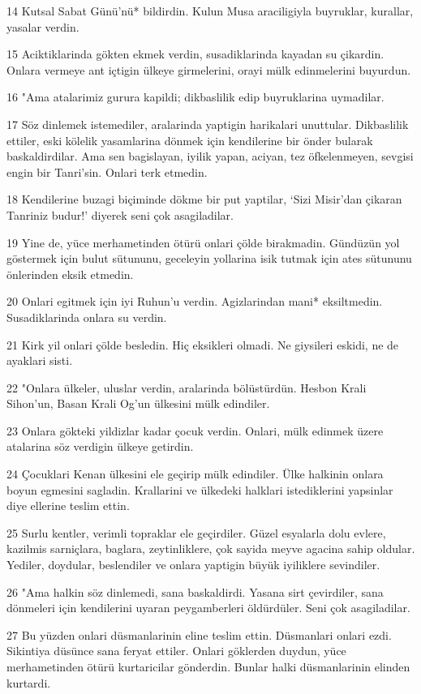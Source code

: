 \par 14 Kutsal Sabat Günü'nü* bildirdin. Kulun Musa araciligiyla buyruklar, kurallar, yasalar verdin.
\par 15 Aciktiklarinda gökten ekmek verdin, susadiklarinda kayadan su çikardin. Onlara vermeye ant içtigin ülkeye girmelerini, orayi mülk edinmelerini buyurdun.
\par 16 "Ama atalarimiz gurura kapildi; dikbaslilik edip buyruklarina uymadilar.
\par 17 Söz dinlemek istemediler, aralarinda yaptigin harikalari unuttular. Dikbaslilik ettiler, eski kölelik yasamlarina dönmek için kendilerine bir önder bularak baskaldirdilar. Ama sen bagislayan, iyilik yapan, aciyan, tez öfkelenmeyen, sevgisi engin bir Tanri'sin. Onlari terk etmedin.
\par 18 Kendilerine buzagi biçiminde dökme bir put yaptilar, `Sizi Misir'dan çikaran Tanriniz budur!' diyerek seni çok asagiladilar.
\par 19 Yine de, yüce merhametinden ötürü onlari çölde birakmadin. Gündüzün yol göstermek için bulut sütununu, geceleyin yollarina isik tutmak için ates sütununu önlerinden eksik etmedin.
\par 20 Onlari egitmek için iyi Ruhun'u verdin. Agizlarindan mani* eksiltmedin. Susadiklarinda onlara su verdin.
\par 21 Kirk yil onlari çölde besledin. Hiç eksikleri olmadi. Ne giysileri eskidi, ne de ayaklari sisti.
\par 22 "Onlara ülkeler, uluslar verdin, aralarinda bölüstürdün. Hesbon Krali Sihon'un, Basan Krali Og'un ülkesini mülk edindiler.
\par 23 Onlara gökteki yildizlar kadar çocuk verdin. Onlari, mülk edinmek üzere atalarina söz verdigin ülkeye getirdin.
\par 24 Çocuklari Kenan ülkesini ele geçirip mülk edindiler. Ülke halkinin onlara boyun egmesini sagladin. Krallarini ve ülkedeki halklari istediklerini yapsinlar diye ellerine teslim ettin.
\par 25 Surlu kentler, verimli topraklar ele geçirdiler. Güzel esyalarla dolu evlere, kazilmis sarniçlara, baglara, zeytinliklere, çok sayida meyve agacina sahip oldular. Yediler, doydular, beslendiler ve onlara yaptigin büyük iyiliklere sevindiler.
\par 26 "Ama halkin söz dinlemedi, sana baskaldirdi. Yasana sirt çevirdiler, sana dönmeleri için kendilerini uyaran peygamberleri öldürdüler. Seni çok asagiladilar.
\par 27 Bu yüzden onlari düsmanlarinin eline teslim ettin. Düsmanlari onlari ezdi. Sikintiya düsünce sana feryat ettiler. Onlari göklerden duydun, yüce merhametinden ötürü kurtaricilar gönderdin. Bunlar halki düsmanlarinin elinden kurtardi.
